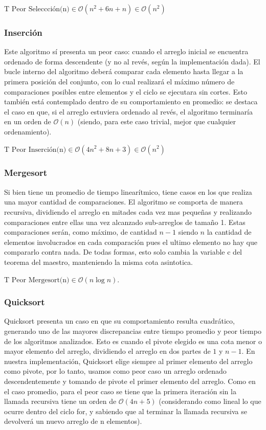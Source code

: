 \documentclass[article,a4paper]{article}
\newcommand{\bigO}{\mathcal{O}}
\begin{document}
$\mbox{T Peor Seleccción(n)} \in \bigO(n^2 + 6n + n) \in \bigO(n^2)$


\subsubsection{Inserción}

Este algoritmo sí presenta un peor caso: cuando el arreglo inicial se encuentra ordenado de forma descendente (y no al revés, según la implementación dada). El bucle interno del algoritmo deberá comparar cada elemento hasta llegar a la primera posición del conjunto, con lo cual realizará el máximo número de comparaciones posibles entre elementos y el ciclo se ejecutara sin cortes. Esto también está contemplado dentro de su comportamiento en promedio: se destaca el caso en que, si el arreglo estuviera ordenado al revés, el algoritmo terminaría en un orden de $\bigO(n)$ (siendo, para este caso trivial, mejor que cualquier ordenamiento).

$\mbox{T Peor Inserción(n)} \in \bigO(4n^2 + 8n + 3) \in \bigO(n^2)$

\subsubsection{Mergesort}

Si bien tiene un promedio de tiempo linearítmico, tiene casos en los que realiza una mayor cantidad de comparaciones. El algoritmo se comporta de manera recursiva, dividiendo el arreglo en mitades cada vez mas pequeñas y realizando comparaciones entre ellas una vez alcanzado sub-arreglos de tamaño 1. Estas comparaciones serán, como máximo, de cantidad $n-1$ siendo $n$ la cantidad de elementos involucrados en cada comparación pues el ultimo elemento no hay que compararlo contra nada. De todas formas,  esto solo cambia la variable c del teorema del maestro, manteniendo la misma cota asintotica.

$\mbox{T Peor Mergesort(n)} \in \bigO(n \log n)$.

\subsubsection{Quicksort}

Quicksort presenta un caso en que su comportamiento resulta cuadrático, generando uno de las mayores discrepancias entre tiempo promedio y peor tiempo de los algoritmos analizados. Esto es cuando el pivote elegido es una cota menor o mayor elemento del arreglo, dividiendo el arreglo en dos partes de $1$ y $n-1$. En nuestra implementación, Quicksort elige siempre al primer elemento del arreglo como pivote, por lo tanto, usamos como peor caso un arreglo ordenado descendentemente y tomando de pivote el primer elemento del arreglo. Como en el caso promedio, para el peor caso se tiene que la primera iteración sin la llamada recursiva tiene un orden de $\bigO(4n + 5)$ (considerando como lineal lo que ocurre dentro del ciclo for, y sabiendo que al terminar la llamada recursiva se devolverá un nuevo arreglo de n elementos).
\end{document}
